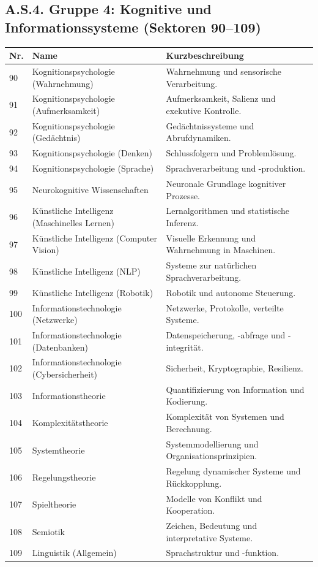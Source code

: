 \documentclass[13pt,a4paper]{article}
\begin{document}
	\subsection*{A.S.4. Gruppe 4: Kognitive und Informationssysteme (Sektoren 90--109)}
	
	\begin{longtable}{|p{0.9cm}|p{6.0cm}|p{8.6cm}|}
		\hline
		\textbf{Nr.} & \textbf{Name} & \textbf{Kurzbeschreibung} \\
		\hline
		\endhead
		90 & Kognitionspsychologie (Wahrnehmung) & Wahrnehmung und sensorische Verarbeitung. \\
		\hline
		91 & Kognitionspsychologie (Aufmerksamkeit) & Aufmerksamkeit, Salienz und exekutive Kontrolle. \\
		\hline
		92 & Kognitionspsychologie (Gedächtnis) & Gedächtnissysteme und Abrufdynamiken. \\
		\hline
		93 & Kognitionspsychologie (Denken) & Schlussfolgern und Problemlösung. \\
		\hline
		94 & Kognitionspsychologie (Sprache) & Sprachverarbeitung und -produktion. \\
		\hline
		95 & Neurokognitive Wissenschaften & Neuronale Grundlage kognitiver Prozesse. \\
		\hline
		96 & Künstliche Intelligenz (Maschinelles Lernen) & Lernalgorithmen und statistische Inferenz. \\
		\hline
		97 & Künstliche Intelligenz (Computer Vision) & Visuelle Erkennung und Wahrnehmung in Maschinen. \\
		\hline
		98 & Künstliche Intelligenz (NLP) & Systeme zur natürlichen Sprachverarbeitung. \\
		\hline
		99 & Künstliche Intelligenz (Robotik) & Robotik und autonome Steuerung. \\
		\hline
		100 & Informationstechnologie (Netzwerke) & Netzwerke, Protokolle, verteilte Systeme. \\
		\hline
		101 & Informationstechnologie (Datenbanken) & Datenspeicherung, -abfrage und -integrität. \\
		\hline
		102 & Informationstechnologie (Cybersicherheit) & Sicherheit, Kryptographie, Resilienz. \\
		\hline
		103 & Informationstheorie & Quantifizierung von Information und Kodierung. \\
		\hline
		104 & Komplexitätstheorie & Komplexität von Systemen und Berechnung. \\
		\hline
		105 & Systemtheorie & Systemmodellierung und Organisationsprinzipien. \\
		\hline
		106 & Regelungstheorie & Regelung dynamischer Systeme und Rückkopplung. \\
		\hline
		107 & Spieltheorie & Modelle von Konflikt und Kooperation. \\
		\hline
		108 & Semiotik & Zeichen, Bedeutung und interpretative Systeme. \\
		\hline
		109 & Linguistik (Allgemein) & Sprachstruktur und -funktion. \\
		\hline
	\end{longtable}
	
\end{document}
